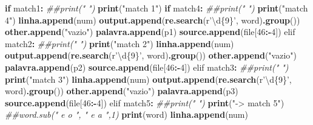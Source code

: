 \documentclass[
  12pt,
]{article}
\newenvironment{Shaded}{\begin{snugshade}}{\end{snugshade}}
\newcommand{\CommentTok}[1]{\textcolor[rgb]{0.56,0.35,0.01}{\textit{#1}}}
\newcommand{\ControlFlowTok}[1]{\textcolor[rgb]{0.13,0.29,0.53}{\textbf{#1}}}
\newcommand{\DecValTok}[1]{\textcolor[rgb]{0.00,0.00,0.81}{#1}}
\newcommand{\KeywordTok}[1]{\textcolor[rgb]{0.13,0.29,0.53}{\textbf{#1}}}
\newcommand{\NormalTok}[1]{#1}
\newcommand{\OperatorTok}[1]{\textcolor[rgb]{0.81,0.36,0.00}{\textbf{#1}}}
\newcommand{\StringTok}[1]{\textcolor[rgb]{0.31,0.60,0.02}{#1}}
\begin{document}
\begin{Shaded}
\begin{Highlighting}[]
                \ControlFlowTok{if}\NormalTok{ match1}\OperatorTok{:}
\StringTok{                        }\CommentTok{##print("   ")}
\StringTok{                        }\KeywordTok{print}\NormalTok{(}\StringTok{"match 1"}\NormalTok{)}
                        \ControlFlowTok{if}\NormalTok{ match4}\OperatorTok{:}
\StringTok{                            }\CommentTok{##print("   ")}
\StringTok{                            }\KeywordTok{print}\NormalTok{(}\StringTok{"match 4"}\NormalTok{)}
                            \KeywordTok{linha.append}\NormalTok{(num)}
                            \KeywordTok{output.append}\NormalTok{(}\KeywordTok{re.search}\NormalTok{(r}\StringTok{'\textbackslash{}d\{9\}'}\NormalTok{, word)}\KeywordTok{.group}\NormalTok{())}
                            \KeywordTok{other.append}\NormalTok{(}\StringTok{"vazio"}\NormalTok{)}
                            \KeywordTok{palavra.append}\NormalTok{(p1)}
                            \KeywordTok{source.append}\NormalTok{(file[}\DecValTok{46}\OperatorTok{:-}\DecValTok{4}\NormalTok{])}
\NormalTok{                elif match2}\OperatorTok{:}
\StringTok{                            }\CommentTok{##print("   ")}
\StringTok{                            }\KeywordTok{print}\NormalTok{(}\StringTok{"match 2"}\NormalTok{)}
                            \KeywordTok{linha.append}\NormalTok{(num)}
                            \KeywordTok{output.append}\NormalTok{(}\KeywordTok{re.search}\NormalTok{(r}\StringTok{'\textbackslash{}d\{9\}'}\NormalTok{, word)}\KeywordTok{.group}\NormalTok{())}
                            \KeywordTok{other.append}\NormalTok{(}\StringTok{"vazio"}\NormalTok{)}
                            \KeywordTok{palavra.append}\NormalTok{(p2)}
                            \KeywordTok{source.append}\NormalTok{(file[}\DecValTok{46}\OperatorTok{:-}\DecValTok{4}\NormalTok{])}
\NormalTok{                elif match3}\OperatorTok{:}
\StringTok{                            }\CommentTok{##print("   ")}
\StringTok{                            }\KeywordTok{print}\NormalTok{(}\StringTok{"match 3"}\NormalTok{)}
                            \KeywordTok{linha.append}\NormalTok{(num)}
                            \KeywordTok{output.append}\NormalTok{(}\KeywordTok{re.search}\NormalTok{(r}\StringTok{'\textbackslash{}d\{9\}'}\NormalTok{, word)}\KeywordTok{.group}\NormalTok{())}
                            \KeywordTok{other.append}\NormalTok{(}\StringTok{"vazio"}\NormalTok{)}
                            \KeywordTok{palavra.append}\NormalTok{(p3)}
                            \KeywordTok{source.append}\NormalTok{(file[}\DecValTok{46}\OperatorTok{:-}\DecValTok{4}\NormalTok{])}
\NormalTok{                elif match5}\OperatorTok{:}
\StringTok{                            }\CommentTok{##print("   ")}
\StringTok{                            }\KeywordTok{print}\NormalTok{(}\StringTok{"-> match 5"}\NormalTok{)}
                            \CommentTok{##word.sub(" e o ", " e a ",1)}
                            \KeywordTok{print}\NormalTok{(word)}
                            \KeywordTok{linha.append}\NormalTok{(num)}


\end{Highlighting}
\end{Shaded}
\end{document}

